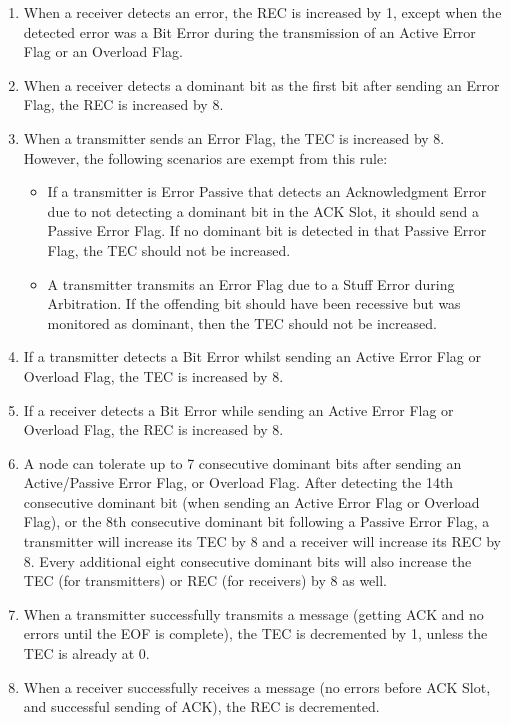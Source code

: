 \documentclass[main\_\_EN.tex]{subfiles}
\begin{document}
\begin{enumerate}
    \item When a receiver detects an error, the REC is increased by 1, except when the detected error was a Bit Error during the transmission of an Active Error Flag or an Overload Flag.
    \item When a receiver detects a dominant bit as the first bit after sending an Error Flag, the REC is increased by 8.
    \item When a transmitter sends an Error Flag, the TEC is increased by 8. However, the following scenarios are exempt from this rule:
    \begin{itemize}
        \item If a transmitter is Error Passive that detects an Acknowledgment Error due to not detecting a dominant bit in the ACK Slot, it should send a Passive Error Flag. If no dominant bit is detected in that Passive Error Flag, the TEC should not be increased.
        \item A transmitter transmits an Error Flag due to a Stuff Error during Arbitration. If the offending bit should have been recessive but was monitored as dominant, then the TEC should not be increased.
    \end{itemize}
    \item If a transmitter detects a Bit Error whilst sending an Active Error Flag or Overload Flag, the TEC is increased by 8.
    \item If a receiver detects a Bit Error while sending an Active Error Flag or Overload Flag, the REC is increased by 8.
    \item A node can tolerate up to 7 consecutive dominant bits after sending an Active/Passive Error Flag, or Overload Flag. After detecting the 14th consecutive dominant bit (when sending an Active Error Flag or Overload Flag), or the 8th consecutive dominant bit following a Passive Error Flag, a transmitter will increase its TEC by 8 and a receiver will increase its REC by 8. Every additional eight consecutive dominant bits will also increase the TEC (for transmitters) or REC (for receivers) by 8 as well.
    \item When a transmitter successfully transmits a message (getting ACK and no errors until the EOF is complete), the TEC is decremented by 1, unless the TEC is already at 0.
    \item When a receiver successfully receives a message (no errors before ACK Slot, and successful sending of ACK), the REC is decremented.
    \begin{itemize}

\end{itemize}
\end{enumerate}
\end{document}
